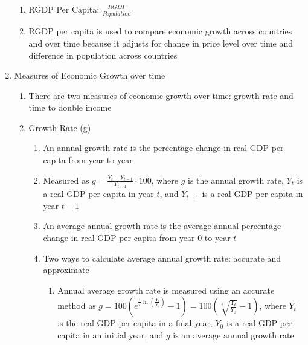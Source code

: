 \documentclass[12pt]{article}
\begin{document}
\begin{enumerate}
\begin{enumerate}
          \item RGDP Per Capita: $\frac{RGDP}{Population}$

          \item RGDP per capita is used to compare economic growth across countries and over time because it adjusts for change in price level over time and difference in population across countries

        \end{enumerate}

      \item Measures of Economic Growth over time

        \begin{enumerate}

          \item There are two measures of economic growth over time: growth rate and time to double income

          \item Growth Rate (g)

            \begin{enumerate}

              \item An annual growth rate is the percentage change in real GDP per capita from year to year

              \item Measured as $g=\frac{Y_t-Y_{t-1}}{Y_{t-1}}\cdot100$, where $g$ is the annual growth rate, $Y_t$ is a real GDP per capita in year $t$, and $Y_{t-1}$ is a real GDP per capita in year $t-1$

              \item An average annual growth rate is the average annual percentage change in real GDP per capita from year 0 to year $t$

              \item Two ways to calculate average annual growth rate: accurate and approximate

                \begin{enumerate}

                  \item Annual average growth rate is measured using an accurate method as $g=100\left( e^{\frac{1}{t}\ln\left( \frac{Y_t}{Y_0} \right)}-1 \right)=100\left( \sqrt[t]{\frac{Y_t}{Y_0}}-1 \right)$, where $Y_t$ is the real GDP per capita in a final year, $Y_0$ is a real GDP per capita in an initial year, and $g$ is an average annual growth rate


\end{enumerate}
\end{enumerate}
\end{enumerate}
\end{enumerate}
\end{document}
